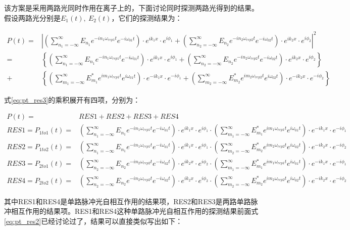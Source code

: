 该方案是采用两路光同时作用在离子上的，下面讨论同时探测两路光得到的结果。假设两路光分别是$E_1(t),\ E_2(t)$，它们的探测结果为：
\begin{footnotesize}
\begin{align}
    P(t)=&\left|\left(\sum_{n_1=-\infty}^{\infty}E_{n_1}e^{-in_1\omega_{rep1}t}e^{-i\omega_{01}t}\right)\cdot e^{ik_1x}\cdot e^{i\phi_1} + \left(\sum_{n_2=-\infty}^{\infty}E_{n_2}e^{-in_2\omega_{rep2}t}e^{-i\omega_{02}t}\right)\cdot e^{ik_2x}\cdot e^{i\phi_2}\right|^2\\
    =&\left\{\left(\sum_{n_1=-\infty}^{\infty}E_{n_1}e^{-in_1\omega_{rep1}t}e^{-i\omega_{01}t}\right)\cdot e^{ik_1x}\cdot e^{i\phi_1} + \left(\sum_{n_2=-\infty}^{\infty}E_{n_2}e^{-in_2\omega_{rep2}t}e^{-i\omega_{02}t}\right)\cdot e^{ik_2x}\cdot e^{i\phi_2}\right\}\\
    +&\left\{\left(\sum_{m_1=-\infty}^{\infty}E_{m_1}^* e^{im_1\omega_{rep1}t}e^{i\omega_{01}t}\right)\cdot e^{-ik_1x}\cdot e^{-i\phi_1} + \left(\sum_{m_2=-\infty}^{\infty}E_{m_2}^*e^{im_2\omega_{rep2}t}e^{i\omega_{02}t}\right)\cdot e^{-ik_2x}\cdot e^{-i\phi_2}\right\}\label{eq:pt_res3}
\end{align}
\end{footnotesize}


式\eqref{eq:pt_res3}的乘积展开有四项，分别为：
\begin{footnotesize}
\begin{align}
    P(t)=&RES1+RES2+RES3+RES4\\
    RES1=P_{1to1}(t)=&\left(\sum_{n_1=-\infty}^{\infty}E_{n_1}e^{-in_1\omega_{rep1}t}e^{-i\omega_{01}t}\right)\cdot e^{ik_1x}\cdot e^{i\phi_1} 
    \cdot \left(\sum_{m_1=-\infty}^{\infty}E_{m_1}^* e^{im_1\omega_{rep1}t}e^{i\omega_{01}t}\right)\cdot e^{-ik_1x}\cdot e^{-i\phi_1}\\
    RES2=P_{1to2}(t)=&\left(\sum_{n_1=-\infty}^{\infty}E_{n_1}e^{-in_1\omega_{rep1}t}e^{-i\omega_{01}t}\right)\cdot e^{ik_1x}\cdot e^{i\phi_1} 
    \cdot \left(\sum_{m_2=-\infty}^{\infty}E_{m_2}^*e^{im_2\omega_{rep2}t}e^{i\omega_{02}t}\right)\cdot e^{-ik_2x}\cdot e^{-i\phi_2}\\
    RES3=P_{2to1}(t)=&\left(\sum_{n_2=-\infty}^{\infty}E_{n_2}e^{-in_2\omega_{rep2}t}e^{-i\omega_{02}t}\right)\cdot e^{ik_2x}\cdot e^{i\phi_2}
    \cdot \left(\sum_{m_1=-\infty}^{\infty}E_{m_1}^* e^{im_1\omega_{rep1}t}e^{i\omega_{01}t}\right)\cdot e^{-ik_1x}\cdot e^{-i\phi_1}\\
    RES4=P_{2to2}(t)=&\left(\sum_{n_2=-\infty}^{\infty}E_{n_2}e^{-in_2\omega_{rep2}t}e^{-i\omega_{02}t}\right)\cdot e^{ik_2x}\cdot e^{i\phi_2}
    \cdot \left(\sum_{m_2=-\infty}^{\infty}E_{m_2}^*e^{im_2\omega_{rep2}t}e^{i\omega_{02}t}\right)\cdot e^{-ik_2x}\cdot e^{-i\phi_2}
\end{align}
\end{footnotesize}
其中RES1和RES4是单路脉冲光自相互作用的结果项，RES2和RES3是两路单路脉冲相互作用的结果项。RES1和RES4这种单路脉冲光自相互作用的探测结果前面式\eqref{eq:pt_res2}已经讨论过了，结果可以直接类似写出如下：

